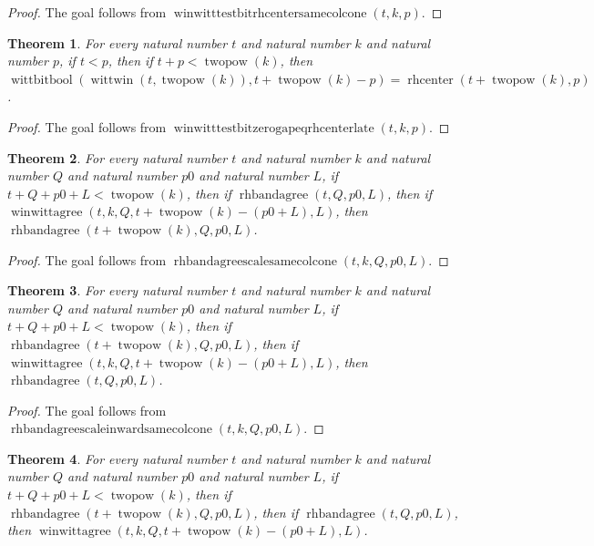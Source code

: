 \documentclass[11pt]{article}
\newtheorem{theorem}{Theorem}[section]
\theoremstyle{definition}
\begin{document}
\begin{proof}
The goal follows from \(\operatorname{winwitttestbitrhcentersamecolcone}(t, k, p)\).
\end{proof}
\begin{theorem}
\label{ll:paper:winwitt-testbit-zero-gap-eq-rhcenter-late}
For every natural number \(t\) and natural number \(k\) and natural number \(p\), if \(t < p\), then if \(t + p < \operatorname{twopow}(k)\), then \(\operatorname{wittbitbool}(\operatorname{wittwin}(t, \operatorname{twopow}(k)), t + \operatorname{twopow}(k) - p) = \operatorname{rhcenter}(t + \operatorname{twopow}(k), p)\).
\end{theorem}
\begin{proof}
The goal follows from \(\operatorname{winwitttestbitzerogapeqrhcenterlate}(t, k, p)\).
\end{proof}
\begin{theorem}
\label{ll:paper:rhbandagree-scale-same-col-cone}
For every natural number \(t\) and natural number \(k\) and natural number \(Q\) and natural number \(p0\) and natural number \(L\), if \(t + Q + p0 + L < \operatorname{twopow}(k)\), then if \(\operatorname{rhbandagree}(t, Q, p0, L)\), then if \(\operatorname{winwittagree}(t, k, Q, t + \operatorname{twopow}(k) - (p0 + L), L)\), then \(\operatorname{rhbandagree}(t + \operatorname{twopow}(k), Q, p0, L)\).
\end{theorem}
\begin{proof}
The goal follows from \(\operatorname{rhbandagreescalesamecolcone}(t, k, Q, p0, L)\).
\end{proof}
\begin{theorem}
\label{ll:paper:rhbandagree-scale-inward-same-col-cone}
For every natural number \(t\) and natural number \(k\) and natural number \(Q\) and natural number \(p0\) and natural number \(L\), if \(t + Q + p0 + L < \operatorname{twopow}(k)\), then if \(\operatorname{rhbandagree}(t + \operatorname{twopow}(k), Q, p0, L)\), then if \(\operatorname{winwittagree}(t, k, Q, t + \operatorname{twopow}(k) - (p0 + L), L)\), then \(\operatorname{rhbandagree}(t, Q, p0, L)\).
\end{theorem}
\begin{proof}
The goal follows from \(\operatorname{rhbandagreescaleinwardsamecolcone}(t, k, Q, p0, L)\).
\end{proof}
\begin{theorem}
\label{ll:paper:winwittagree-rhcenter-same-col-cone}
For every natural number \(t\) and natural number \(k\) and natural number \(Q\) and natural number \(p0\) and natural number \(L\), if \(t + Q + p0 + L < \operatorname{twopow}(k)\), then if \(\operatorname{rhbandagree}(t + \operatorname{twopow}(k), Q, p0, L)\), then if \(\operatorname{rhbandagree}(t, Q, p0, L)\), then \(\operatorname{winwittagree}(t, k, Q, t + \operatorname{twopow}(k) - (p0 + L), L)\).
\end{theorem}
\end{document}
